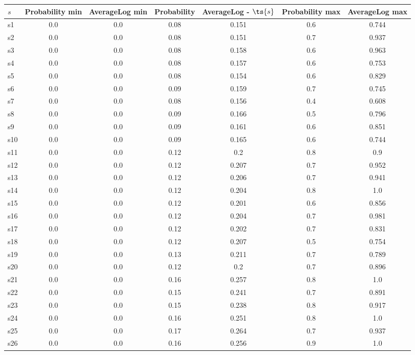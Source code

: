 \documentclass{article}
\begin{document}
\noindent\begin{tabular}{|l|c|c|c|c|c|c|}
\hline
$s$& Probability min & AverageLog min & Probability & AverageLog - $\ts{s}$ & Probability max & AverageLog max\\
\hline
s1 &0.0 & 0.0 & 0.08 & 0.151 & 0.6 & 0.744\\
\hline
s2 &0.0 & 0.0 & 0.08 & 0.151 & 0.7 & 0.937\\
\hline
s3 &0.0 & 0.0 & 0.08 & 0.158 & 0.6 & 0.963\\
\hline
s4 &0.0 & 0.0 & 0.08 & 0.157 & 0.6 & 0.753\\
\hline
s5 &0.0 & 0.0 & 0.08 & 0.154 & 0.6 & 0.829\\
\hline
s6 &0.0 & 0.0 & 0.09 & 0.159 & 0.7 & 0.745\\
\hline
s7 &0.0 & 0.0 & 0.08 & 0.156 & 0.4 & 0.608\\
\hline
s8 &0.0 & 0.0 & 0.09 & 0.166 & 0.5 & 0.796\\
\hline
s9 &0.0 & 0.0 & 0.09 & 0.161 & 0.6 & 0.851\\
\hline
s10 &0.0 & 0.0 & 0.09 & 0.165 & 0.6 & 0.744\\
\hline
s11 &0.0 & 0.0 & 0.12 & 0.2 & 0.8 & 0.9\\
\hline
s12 &0.0 & 0.0 & 0.12 & 0.207 & 0.7 & 0.952\\
\hline
s13 &0.0 & 0.0 & 0.12 & 0.206 & 0.7 & 0.941\\
\hline
s14 &0.0 & 0.0 & 0.12 & 0.204 & 0.8 & 1.0\\
\hline
s15 &0.0 & 0.0 & 0.12 & 0.201 & 0.6 & 0.856\\
\hline
s16 &0.0 & 0.0 & 0.12 & 0.204 & 0.7 & 0.981\\
\hline
s17 &0.0 & 0.0 & 0.12 & 0.202 & 0.7 & 0.831\\
\hline
s18 &0.0 & 0.0 & 0.12 & 0.207 & 0.5 & 0.754\\
\hline
s19 &0.0 & 0.0 & 0.13 & 0.211 & 0.7 & 0.789\\
\hline
s20 &0.0 & 0.0 & 0.12 & 0.2 & 0.7 & 0.896\\
\hline
s21 &0.0 & 0.0 & 0.16 & 0.257 & 0.8 & 1.0\\
\hline
s22 &0.0 & 0.0 & 0.15 & 0.241 & 0.7 & 0.891\\
\hline
s23 &0.0 & 0.0 & 0.15 & 0.238 & 0.8 & 0.917\\
\hline
s24 &0.0 & 0.0 & 0.16 & 0.251 & 0.8 & 1.0\\
\hline
s25 &0.0 & 0.0 & 0.17 & 0.264 & 0.7 & 0.937\\
\hline
s26 &0.0 & 0.0 & 0.16 & 0.256 & 0.9 & 1.0\\

\end{tabular}
\end{document}

